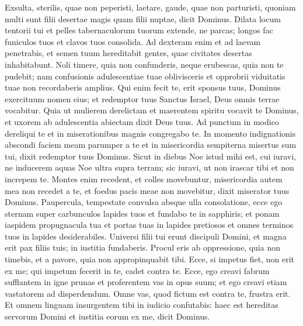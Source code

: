 \begin{biblechapter}  
\verse Exsulta, sterilis, quae non peperisti, laetare, gaude, quae non parturisti, quoniam multi sunt filii desertae magis quam filii nuptae, dicit Dominus. 
\verse Dilata locum tentorii tui et pelles tabernaculorum tuorum extende, ne parcas; longos fac funiculos tuos et clavos tuos consolida. 
\verse Ad dexteram enim et ad laevam penetrabis, et semen tuum hereditabit gentes, quae civitates desertas inhabitabunt. 
\verse Noli timere, quia non confunderis, neque erubescas, quia non te pudebit; nam confusionis adulescentiae tuae oblivisceris et opprobrii viduitatis tuae non recordaberis amplius. 
\verse Qui enim fecit te, erit sponsus tuus, Dominus exercituum nomen eius; et redemptor tuus Sanctus Israel, Deus omnis terrae vocabitur. 
\verse Quia ut mulierem derelictam et maerentem spiritu vocavit te Dominus, et uxorem ab adulescentia abiectam dixit Deus tuus. 
\verse Ad punctum in modico dereliqui te et in miserationibus magnis congregabo te. 
\verse In momento indignationis abscondi faciem meam parumper a te et in misericordia sempiterna misertus sum tui, dixit redemptor tuus Dominus. 
\verse Sicut in diebus Noe istud mihi est, cui iuravi, ne inducerem aquas Noe ultra supra terram; sic iuravi, ut non irascar tibi et non increpem te. 
\verse Montes enim recedent, et colles movebuntur, misericordia autem mea non recedet a te, et foedus pacis meae non movebitur, dixit miserator tuus Dominus. 
\verse Paupercula, tempestate convulsa absque ulla consolatione, ecce ego sternam super carbunculos lapides tuos et fundabo te in sapphiris; 
\verse et ponam iaspidem propugnacula tua et portas tuas in lapides pretiosos et omnes terminos tuos in lapides desiderabiles. 
\verse Universi filii tui erunt discipuli Domini, et magna erit pax filiis tuis; 
\verse in iustitia fundaberis. Procul eris ab oppressione, quia non timebis, et a pavore, quia non appropinquabit tibi. 
\verse Ecce, si impetus fiet, non erit ex me; qui impetum fecerit in te, cadet contra te. 
\verse Ecce, ego creavi fabrum sufflantem in igne prunas et proferentem vas in opus suum; et ego creavi etiam vastatorem ad disperdendum. 
\verse Omne vas, quod fictum est contra te, frustra erit. Et omnem linguam insurgentem tibi in iudicio confutabis: haec est hereditas servorum Domini et iustitia eorum ex me, dicit Dominus. 
\end{biblechapter}

